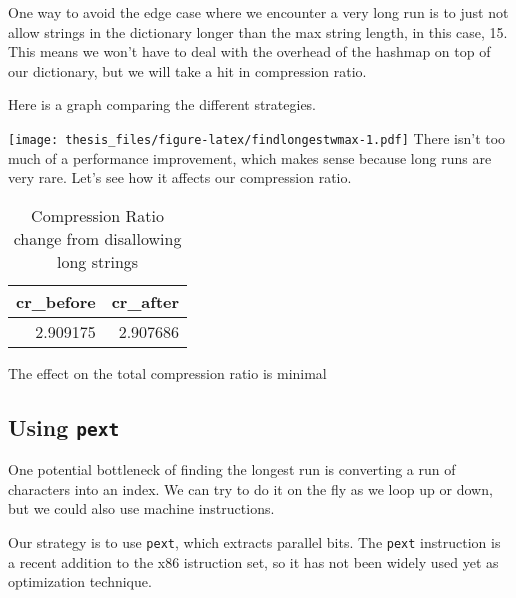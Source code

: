 \documentclass[12pt,twoside]{reedthesis}
\begin{document}
One way to avoid the edge case where we encounter a very long run is to just not allow strings in the dictionary longer than the max string length, in this case, 15. This means we won't have to deal with the overhead of the hashmap on top of our dictionary, but we will take a hit in compression ratio.

Here is a graph comparing the different strategies.

\texttt{[image: thesis\_files/figure-latex/findlongestwmax-1.pdf]}
There isn't too much of a performance improvement, which makes sense because long runs are very rare. Let's see how it affects our compression ratio.
\begin{table}

\caption{\label{tab:maxenforcedstats}Compression Ratio change from disallowing long strings}
\centering
\begin{tabular}[t]{rr}
\toprule
cr\_before & cr\_after\\
\midrule
2.909175 & 2.907686\\
\bottomrule
\end{tabular}
\end{table}
The effect on the total compression ratio is minimal

\hypertarget{using-pext}{%
\subsection{\texorpdfstring{Using \texttt{pext}}{Using pext}}\label{using-pext}}

One potential bottleneck of finding the longest run is converting a run of characters into an index. We can try to do it on the fly as we loop up or down, but we could also use machine instructions.

Our strategy is to use \texttt{pext}, which extracts parallel bits. The \texttt{pext} instruction is a recent addition to the x86 istruction set, so it has not been widely used yet as optimization technique.
\end{document}
